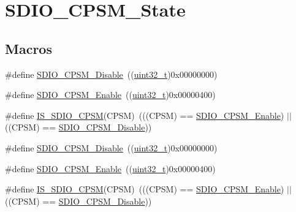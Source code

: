 \hypertarget{group___s_d_i_o___c_p_s_m___state}{}\section{S\+D\+I\+O\+\_\+\+C\+P\+S\+M\+\_\+\+State}
\label{group___s_d_i_o___c_p_s_m___state}
\subsection*{Macros}
\begin{DoxyCompactItemize}
\item 
\#define \hyperlink{group___s_d_i_o___c_p_s_m___state_ga996751273ad238e255a740f7c2844c6c}{S\+D\+I\+O\+\_\+\+C\+P\+S\+M\+\_\+\+Disable}~((\hyperlink{_p_e___types_8h_a33594304e786b158f3fb30289278f5af}{uint32\+\_\+t})0x00000000)
\item 
\#define \hyperlink{group___s_d_i_o___c_p_s_m___state_gad437cefe89d6175aa074a1c40b909ebc}{S\+D\+I\+O\+\_\+\+C\+P\+S\+M\+\_\+\+Enable}~((\hyperlink{_p_e___types_8h_a33594304e786b158f3fb30289278f5af}{uint32\+\_\+t})0x00000400)
\item 
\#define \hyperlink{group___s_d_i_o___c_p_s_m___state_ga58cf04903dab015106e4e0937bef443b}{I\+S\+\_\+\+S\+D\+I\+O\+\_\+\+C\+P\+SM}(C\+P\+SM)~(((C\+P\+SM) == \hyperlink{openmotestm_2library_2inc_2stm32f10x__sdio_8h_ad437cefe89d6175aa074a1c40b909ebc}{S\+D\+I\+O\+\_\+\+C\+P\+S\+M\+\_\+\+Enable}) $\vert$$\vert$ ((C\+P\+SM) == \hyperlink{openmotestm_2library_2inc_2stm32f10x__sdio_8h_a996751273ad238e255a740f7c2844c6c}{S\+D\+I\+O\+\_\+\+C\+P\+S\+M\+\_\+\+Disable}))
\item 
\#define \hyperlink{group___s_d_i_o___c_p_s_m___state_ga996751273ad238e255a740f7c2844c6c}{S\+D\+I\+O\+\_\+\+C\+P\+S\+M\+\_\+\+Disable}~((\hyperlink{_p_e___types_8h_a33594304e786b158f3fb30289278f5af}{uint32\+\_\+t})0x00000000)
\item 
\#define \hyperlink{group___s_d_i_o___c_p_s_m___state_gad437cefe89d6175aa074a1c40b909ebc}{S\+D\+I\+O\+\_\+\+C\+P\+S\+M\+\_\+\+Enable}~((\hyperlink{_p_e___types_8h_a33594304e786b158f3fb30289278f5af}{uint32\+\_\+t})0x00000400)
\item 
\#define \hyperlink{group___s_d_i_o___c_p_s_m___state_ga58cf04903dab015106e4e0937bef443b}{I\+S\+\_\+\+S\+D\+I\+O\+\_\+\+C\+P\+SM}(C\+P\+SM)~(((C\+P\+SM) == \hyperlink{openmotestm_2library_2inc_2stm32f10x__sdio_8h_ad437cefe89d6175aa074a1c40b909ebc}{S\+D\+I\+O\+\_\+\+C\+P\+S\+M\+\_\+\+Enable}) $\vert$$\vert$ ((C\+P\+SM) == \hyperlink{openmotestm_2library_2inc_2stm32f10x__sdio_8h_a996751273ad238e255a740f7c2844c6c}{S\+D\+I\+O\+\_\+\+C\+P\+S\+M\+\_\+\+Disable}))
\end{DoxyCompactItemize}


